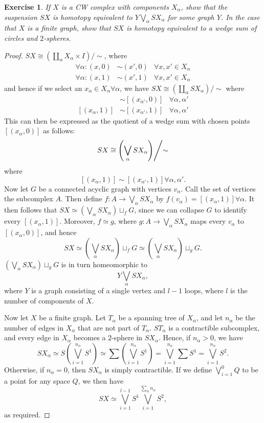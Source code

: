\documentclass{article}
\newtheorem{exercise}{Exercise}[subsection]
\begin{document}
\begin{exercise}
If $X$ is a CW complex with components $X_\alpha$, show that the suspension $SX$ is homotopy equivalent to $Y\bigvee_\alpha SX_\alpha$ for some graph $Y$. In the case that $X$ is a finite graph, show that $SX$ is homotopy equivalent to a wedge sum of circles and $2$-spheres.
\end{exercise}
\begin{proof}
$SX\cong(\coprod_\alpha X_\alpha\times I)/\sim$, where\begin{align*}
\forall\alpha:(x,0)&\sim(x',0)&\forall x,x'\in X_\alpha\\\forall\alpha:(x,1)&\sim(x',1)&\forall x,x'\in X_\alpha
\end{align*} and hence if we select an $x_\alpha\in X_\alpha\forall\alpha$, we have $SX\cong(\coprod_\alpha SX_\alpha)/\sim$ where\begin{align*}
[(x_\alpha,0)]&\sim[(x_{\alpha'},0)]&\forall \alpha,\alpha'\\ [(x_\alpha,1)]&\sim[(x_{\alpha'},1)]&\forall \alpha,\alpha'
\end{align*} This can then be expressed as the quotient of a wedge sum with chosen points $[(x_\alpha,0)]$ as follows:\[\left.SX\cong\left(\bigvee_\alpha SX_\alpha\right)\middle/\sim\right.\] where\[[(x_\alpha,1)]\sim[(x_{\alpha'},1)]\forall \alpha,\alpha'.\]Now let $G$ be a connected acyclic graph with vertices $v_\alpha$. Call the set of vertices the subcomplex $A$. Then define $f:A\to \bigvee_\alpha SX_\alpha$ by $f(v_\alpha)=[(x_\alpha,1)]\forall\alpha$. It then follows that $SX\simeq\left(\bigvee_\alpha SX_\alpha\right)\sqcup_f G$, since we can collapse $G$ to identify every $[(x_\alpha,1)]$. Moreover, $f\simeq g$, where $g:A\to \bigvee_\alpha SX_\alpha$ maps every $v_\alpha$ to $[(x_\alpha,0)]$, and hence \[SX\simeq\left(\bigvee_\alpha SX_\alpha\right)\sqcup_f G\simeq\left(\bigvee_\alpha SX_\alpha\right)\sqcup_g G.\] $\left(\bigvee_\alpha SX_\alpha\right)\sqcup_g G$ is in turn homeomorphic to \[Y\bigvee_\alpha SX_\alpha,\] where $Y$ is a graph consisting of a single vertex and $l-1$ loops, where $l$ is the number of components of $X$.\newline

\noindent Now let $X$ be a finite graph. Let $T_\alpha$ be a spanning tree of $X_\alpha$, and let $n_\alpha$ be the number of edges in $X_\alpha$ that are not part of $T_\alpha$. $ST_\alpha$ is a contractible subcomplex, and every edge in $X_\alpha$ becomes a $2$-sphere in $SX_\alpha$. Hence, if $n_\alpha>0$, we have \[SX_\alpha\simeq S\left(\bigvee_{i=1}^{n_\alpha}S^1\right)\simeq\sum\left(\bigvee_{i=1}^{n_\alpha}S^1\right)=\bigvee_{i=1}^{n_\alpha}\sum S^1=\bigvee_{i=1}^{n_\alpha}S^2.\] Otherwise, if $n_\alpha=0$, then $SX_\alpha$ is simply contractible. If we define $\bigvee_{i=1}^0Q
$ to be a point for any space $Q$, we then have\[SX\simeq \bigvee_{i=1}^{l-1}S^1\bigvee_{i=1}^{\sum_\alpha n_\alpha}S^2,\] as required.
\end{proof}
\end{document}
